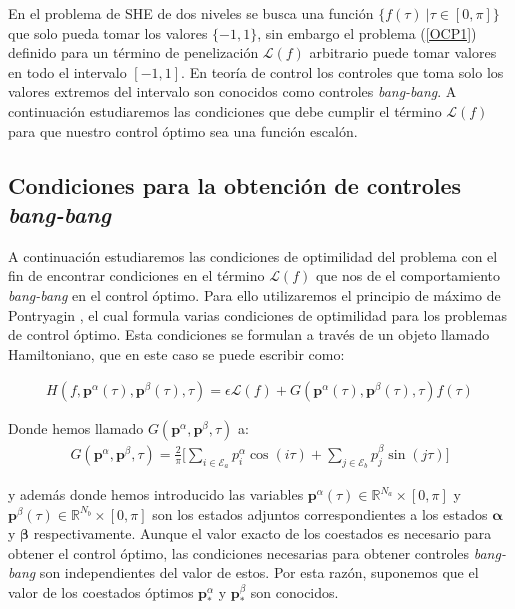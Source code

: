 En el problema de SHE de dos niveles se busca una función $\{f(\tau) \ |  \tau \in [0,\pi] \}$  que solo pueda tomar los valores $\{-1,1\}$, sin embargo el problema (\ref{OCP1}) definido para un término de penelización $\mathcal{L}(f)$ arbitrario puede tomar valores en todo el intervalo $[-1,1]$. 
%
En teoría de control los controles que toma solo los valores extremos del intervalo son conocidos como controles \emph{bang-bang}. A continuación estudiaremos las condiciones que debe cumplir el término $\mathcal{L}(f)$ para que nuestro control óptimo sea una función escalón.

\subsection{Condiciones  para la obtención de controles \emph{bang-bang}}
A continuación estudiaremos las condiciones de optimilidad del problema con el fin de encontrar condiciones en el término $\mathcal{L}(f)$ que nos de el comportamiento \emph{bang-bang} en el control óptimo. 
%
Para ello utilizaremos el principio de máximo de Pontryagin \cite{pontryagin2018mathematical}, el cual formula varias condiciones de optimilidad para los problemas de control óptimo. 
%
Esta condiciones se formulan a través de un objeto llamado Hamiltoniano, que  en este caso se puede escribir como:


\begin{gather}\label{hamil}
    H(f,\bm{p}^\alpha(\tau),\bm{p}^\beta(\tau),\tau) = \epsilon \mathcal{L}(f) + 
    G(\bm{p}^\alpha(\tau),\bm{p}^\beta(\tau),\tau) f(\tau)
\end{gather}

Donde  hemos llamado $G(\bm{p}^\alpha,\bm{p}^\beta,\tau)$ a:
    \begin{gather}
        G(\bm{p}^\alpha,\bm{p}^\beta,\tau) = \frac{2}{\pi} \Bigg[ 
            \sum_{i \in \mathcal{E}_a} p^\alpha_i \cos(i\tau)+ 
            \sum_{j \in \mathcal{E}_b} p^\beta_j \sin(j\tau) 
        \Bigg]
    \end{gather}

y además donde hemos introducido las variables $\bm{p}^\alpha(\tau) \in \mathbb{R}^{N_a} \times [0,\pi]$ y $\bm{p}^\beta(\tau) \in \mathbb{R}^{N_b}  \times [0,\pi]$ son los estados adjuntos correspondientes a los estados $\bm{\alpha}$ y $\bm{\beta}$ respectivamente.  
%
Aunque el valor exacto de los coestados es necesario para obtener el control óptimo, las condiciones necesarias para obtener controles \emph{bang-bang} son independientes del valor de estos. Por esta razón, suponemos que el valor de los coestados óptimos $\bm{p}_*^\alpha$ y $\bm{p}_*^\beta$ son conocidos.
\newline 

